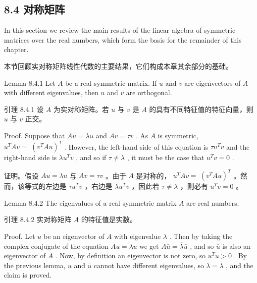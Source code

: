 \documentclass[10pt]{article}
\begin{document}
\begin{tcolorbox}\relax
\section*{8.4 对称矩阵}
\end{tcolorbox}

In this section we review the main results of the linear algebra of symmetric matrices over the real numbers, which form the basis for the remainder of this chapter.

\begin{tcolorbox}\relax
本节回顾实对称矩阵线性代数的主要结果，它们构成本章其余部分的基础。
\end{tcolorbox}

Lemma 8.4.1 Let \(A\) be a real symmetric matrix. If \(u\) and \(v\) are eigenvectors of \(A\) with different eigenvalues, then \(u\) and \(v\) are orthogonal.

\begin{tcolorbox}\relax
引理 8.4.1 设 \(A\) 为实对称矩阵。若 \(u\) 与 \(v\) 是 \(A\) 的具有不同特征值的特征向量，则 \(u\) 与 \(v\) 正交。
\end{tcolorbox}

Proof. Suppose that \({Au} = {\lambda u}\) and \({Av} = {\tau v}\) . As \(A\) is symmetric, \({u}^{T}{Av} = \; {\left( {v}^{T}Au\right) }^{T}\) . However, the left-hand side of this equation is \(\tau {u}^{T}v\) and the right-hand side is \(\lambda {u}^{T}v\) , and so if \(\tau  \neq  \lambda\) , it must be the case that \({u}^{T}v = 0\) .

\begin{tcolorbox}\relax
证明。假设 \({Au} = {\lambda u}\) 与 \({Av} = {\tau v}\) 。由于 \(A\) 是对称的， \({u}^{T}{Av} = \; {\left( {v}^{T}Au\right) }^{T}\) 。然而，该等式的左边是 \(\tau {u}^{T}v\) ，右边是 \(\lambda {u}^{T}v\) ，因此若 \(\tau  \neq  \lambda\) ，则必有 \({u}^{T}v = 0\) 。
\end{tcolorbox}

Lemma 8.4.2 The eigenvalues of a real symmetric matrix \(A\) are real numbers.

\begin{tcolorbox}\relax
引理 8.4.2 实对称矩阵 \(A\) 的特征值是实数。
\end{tcolorbox}

Proof. Let \(u\) be an eigenvector of \(A\) with eigenvalue \(\lambda\) . Then by taking the complex conjugate of the equation \({Au} = {\lambda u}\) we get \(A\bar{u} = \overline{\lambda }\bar{u}\) , and so \(\bar{u}\) is also an eigenvector of \(A\) . Now, by definition an eigenvector is not zero, so \({u}^{T}\bar{u} > 0\) . By the previous lemma, \(u\) and \(\bar{u}\) cannot have different eigenvalues, so \(\lambda  = \overline{\lambda }\) , and the claim is proved.
\end{document}
